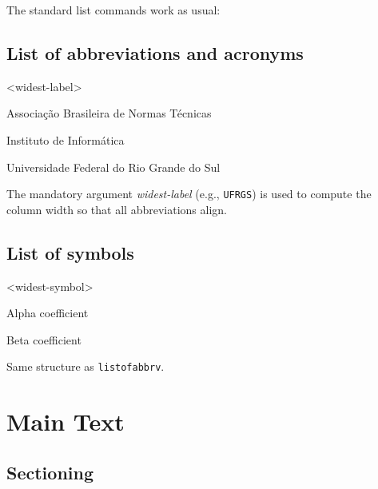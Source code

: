 \documentclass[11pt,a4paper]{article}
\newcommand{\env}[1]{\texttt{#1}}
\newcommand{\meta}[1]{\textit{\textlangle#1\textrangle}}
\begin{document}
The standard list commands work as usual:

\begin{latex}
\tableofcontents
\listoffigures
\listoftables
\end{latex}

\subsection{List of abbreviations and acronyms}

\begin{latex}
\begin{listofabbrv}{<widest-label>}
  \item[ABNT]  Associação Brasileira de Normas Técnicas
  \item[INF]   Instituto de Informática
  \item[UFRGS] Universidade Federal do Rio Grande do Sul
\end{listofabbrv}
\end{latex}

The mandatory argument \meta{widest-label} (e.g., \texttt{UFRGS}) is used
to compute the column width so that all abbreviations align.

\subsection{List of symbols}

\begin{latex}
\begin{listofsymbols}{<widest-symbol>}
  \item[$\alpha$] Alpha coefficient
  \item[$\beta$]  Beta coefficient
\end{listofsymbols}
\end{latex}

Same structure as \env{listofabbrv}.

\section{Main Text}
\label{sec:maintext}

\subsection{Sectioning}
\end{document}
